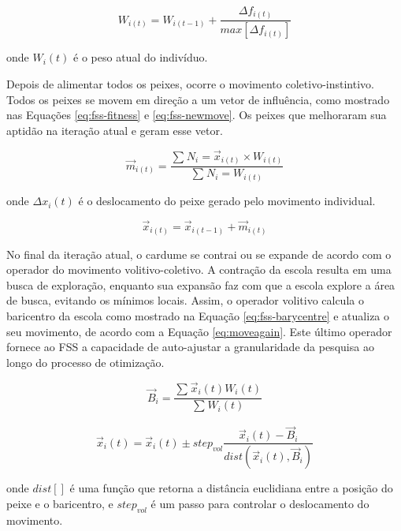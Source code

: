 \begin{equation} \label{eq:fss-feeding}
    W_{i(t)} = W_{i(t-1)} + \frac{\Delta f_{i(t)}}{max[\Delta f_{i(t)}]}
\end{equation}

onde $W_{i}(t)$ é o peso atual do indivíduo.

Depois de alimentar todos os peixes, ocorre o movimento coletivo-instintivo. Todos os peixes se movem em direção a um vetor de influência, como mostrado nas Equações \ref{eq:fss-fitness} e \ref{eq:fss-newmove}. Os peixes que melhoraram sua aptidão na iteração atual e geram esse vetor.

\begin{equation} \label{eq:fss-fitness}
    \vec{m}_{i(t)} = \frac{\sum_{}^{} N_i = \vec{x}_{i(t)} \times W_{i(t)}}{\sum_{}^{} N_i = W_{i(t)}}
\end{equation}

onde $\Delta x_{i}(t)$ é o deslocamento do peixe gerado pelo movimento individual.

\begin{equation} \label{eq:fss-newmove}
    \vec{x}_{i(t)} = \vec{x}_{i(t-1)} + \vec{m}_{i(t)}
\end{equation}

No final da iteração atual, o cardume se contrai ou se expande de acordo com o operador do movimento volitivo-coletivo. A contração da escola resulta em uma busca de exploração, enquanto sua expansão faz com que a escola explore a área de busca, evitando os mínimos locais. Assim, o operador volitivo calcula o baricentro da escola como mostrado na Equação \ref{eq:fss-barycentre} e atualiza o seu movimento, de acordo com a Equação \ref{eq:moveagain}. Este último operador fornece ao FSS a capacidade de auto-ajustar a granularidade da pesquisa ao longo do processo de otimização.

\begin{equation} \label{eq:fss-barycentre}
    \vec{B}_i = \frac{\sum_{}^{} \vec{x}_{i}(t)W_{i}(t)}{\sum_{}^{} W_{i}(t)}
\end{equation}

\begin{equation} \label{eq:moveagain}
    \vec{x}_{i}(t) = \vec{x}_{i}(t) \pm step_{vol}\frac{\vec{x}_{i}(t) - \vec{B}_i}{dist(\vec{x}_{i}(t), \vec{B}_i)}
\end{equation}

onde $dist[]$ é uma função que retorna a distância euclidiana entre a posição do peixe e o baricentro, e $step_{vol}$ é um passo para controlar o deslocamento do movimento.


